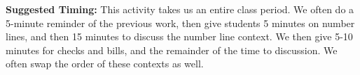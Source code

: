 \documentclass[nooutcomes]{ximera}
\begin{document}
\begin{instructorNotes}
{\bf Suggested Timing:} This activity takes us an entire class period.  We often do a 5-minute reminder of the previous work, then give students 5 minutes on number lines, and then 15 minutes to discuss the number line context.  We then give 5-10 minutes for checks and bills, and the remainder of the time to discussion.  We often swap the order of these contexts as well.
\end{instructorNotes}
\end{document}
